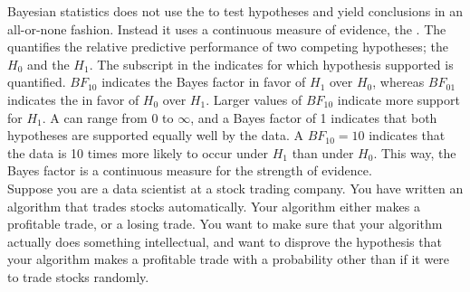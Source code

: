 \setcounter{chapter}{8}
\setcounter{section}{4}
\setcounter{question}{0}



Bayesian statistics does not use the  to test hypotheses and yield conclusions in an all-or-none fashion. Instead it uses a continuous measure of evidence, the . The  quantifies the relative predictive performance of two competing hypotheses; the  $H_0$ and the  $H_1$. The subscript in the  indicates for which hypothesis supported is quantified. $BF_{10}$ indicates the Bayes factor in favor of $H_1$ over $H_0$, whereas $BF_{01}$ indicates the  in favor of $H_0$ over $H_1$. Larger values of $BF_{10}$ indicate more support for $H_1$. A  can range from 0 to $\infty$, and a Bayes factor of 1 indicates that both hypotheses are supported equally well by the data. A $BF_{10} = 10$ indicates that the data is 10 times more likely to occur under $H_1$ than under $H_0$. This way, the Bayes factor is a continuous measure for the strength of evidence. \\

Suppose you are a data scientist at a stock trading company. You have written an algorithm that trades stocks automatically. Your algorithm either makes a profitable trade, or a losing trade. You want to make sure that your algorithm actually does something intellectual, and want to disprove the hypothesis that your algorithm makes a profitable trade with a probability other than if it were to trade stocks randomly. \\


\hypothesesbox



